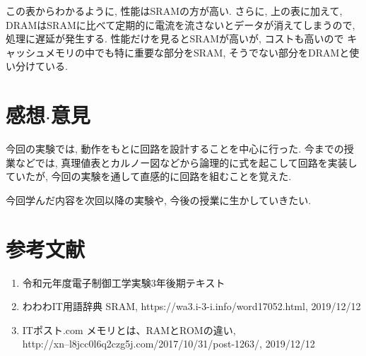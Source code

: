 \documentclass[titlepage]{jsarticle}
\begin{document}
  この表からわかるように, 性能はSRAMの方が高い.
  さらに, 上の表に加えて, DRAMはSRAMに比べて定期的に電流を流さないとデータが消えてしまうので,
  処理に遅延が発生する.
  性能だけを見るとSRAMが高いが, コストも高いので
  キャッシュメモリの中でも特に重要な部分をSRAM, そうでない部分をDRAMと使い分けている.
\section{感想$\cdot$意見}
  今回の実験では, 動作をもとに回路を設計することを中心に行った.
  今までの授業などでは, 真理値表とカルノー図などから論理的に式を起こして回路を実装していたが,
  今回の実験を通して直感的に回路を組むことを覚えた.

  今回学んだ内容を次回以降の実験や, 今後の授業に生かしていきたい.
\section*{参考文献}
  \begin{enumerate}
    \item 令和元年度電子制御工学実験3年後期テキスト
    \item わわわIT用語辞典 SRAM, https://wa3.i-3-i.info/word17052.html, 2019/12/12
    \item ITポスト.com メモリとは、RAMとROMの違い,
      \\http://xn--l8jcc0l6q2czg5j.com/2017/10/31/post-1263/, 2019/12/12
  \end{enumerate}
\end{document}
